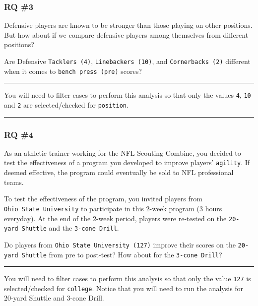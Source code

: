 \documentclass[
]{article}
\begin{document}
\hypertarget{rq-3}{%
\subsubsection{RQ \#3}\label{rq-3}}

Defensive players are known to be stronger than those playing on other positions. But how about if we compare defensive players among themselves from different positions?

Are Defensive \texttt{Tacklers\ (4)}, \texttt{Linebackers\ (10)}, and \texttt{Cornerbacks\ (2)} different when it comes to \texttt{bench\ press\ (pre)} scores?

\begin{center}\rule{0.5\linewidth}{0.5pt}\end{center}

You will need to filter cases to perform this analysis so that only the values \texttt{4}, \texttt{10} and \texttt{2} are selected/checked for \texttt{position}.

\begin{center}\rule{0.5\linewidth}{0.5pt}\end{center}

\hypertarget{rq-4}{%
\subsubsection{RQ \#4}\label{rq-4}}

As an athletic trainer working for the NFL Scouting Combine, you decided to test the effectiveness of a program you developed to improve players' \texttt{agility}. If deemed effective, the program could eventually be sold to NFL professional teams.

To test the effectiveness of the program, you invited players from \texttt{Ohio\ State\ University} to participate in this 2-week program (3 hours everyday). At the end of the 2-week period, players were re-tested on the \texttt{20-yard\ Shuttle} and the \texttt{3-cone\ Drill}.

Do players from \texttt{Ohio\ State\ University\ (127)} improve their scores on the \texttt{20-yard\ Shuttle} from pre to post-test? How about for the \texttt{3-cone\ Drill}?

\begin{center}\rule{0.5\linewidth}{0.5pt}\end{center}

You will need to filter cases to perform this analysis so that only the value \texttt{127} is selected/checked for \texttt{college}. Notice that you will need to run the analysis for 20-yard Shuttle and 3-cone Drill.
\end{document}
